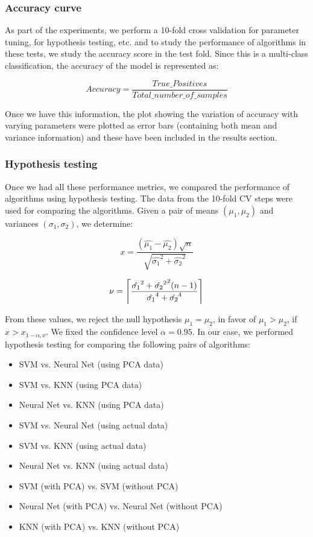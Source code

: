 \documentclass[10pt]{scrartcl}
\DeclarePairedDelimiter{\ceil}{\lceil}{\rceil}
\begin{document}
\subsubsection*{Accuracy curve}
As part of the experiments, we perform a 10-fold cross validation for parameter tuning, for hypothesis testing, etc. and to study the performance of algorithms in these tests, we study the accuracy score in the test fold. Since this is a multi-class classification, the accuracy of the model is represented as:

\begin{equation*}
Accuracy = \frac{True\_Positives}{Total\_number\_of\_samples}
\end{equation*}

Once we have this information, the plot showing the variation of accuracy with varying parameters were plotted as error bars (containing both mean and variance information) and these have been included in the results section.

\subsubsection*{Hypothesis testing}
Once we had all these performance metrics, we compared the performance of algorithms using hypothesis testing. The data from the 10-fold CV steps were used for comparing the algorithms. Given a pair of means $(\mu_{1}, \mu_{2})$ and variances $(\sigma_1,\sigma_2)$, we determine:

\begin{equation*}
x = \frac{(\hat{\mu_1} - \hat{\mu_2})\sqrt{n}}{\sqrt{\hat{\sigma_1}^{2} + \hat{\sigma_2}^{2}}}
\end{equation*}

\begin{equation*}
\nu = \ceil*{\frac{{\hat{\sigma_1}^{2} + \hat{\sigma_2}^{2}}^{2}(n-1)}{\hat{\sigma_1}^{4} + \hat{\sigma_2}^{4}}}
\end{equation*}

From these values, we reject the null hypothesis $\mu_1 = \mu_2$, in favor of $\mu_1 > \mu_2$, if $x > x_{1-\alpha, \nu}$. We fixed the confidence level $\alpha = 0.95$. In our case, we performed hypothesis testing for comparing the following pairs of algorithms:

\begin{itemize}
\item SVM vs. Neural Net (using PCA data)
\item SVM vs. KNN (using PCA data)
\item Neural Net vs. KNN (using PCA data)
\item SVM vs. Neural Net (using actual data)
\item SVM vs. KNN (using actual data)
\item Neural Net vs. KNN (using actual data)
\item SVM (with PCA) vs. SVM (without PCA)
\item Neural Net (with PCA) vs. Neural Net (without PCA)
\item KNN (with PCA) vs. KNN (without PCA)
\end{itemize}
\end{document}
